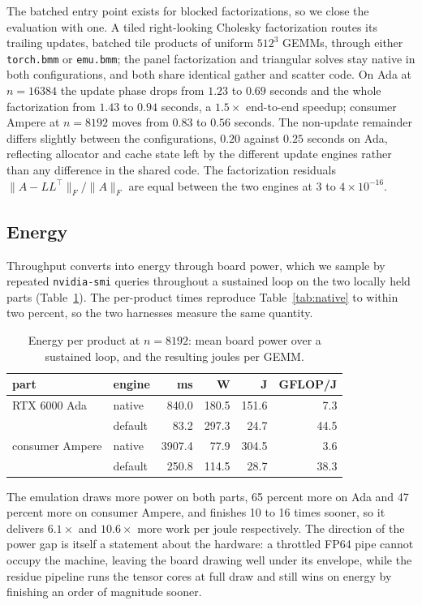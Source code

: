 \documentclass[11pt]{amsart}
\theoremstyle{plain}
\theoremstyle{definition}
\newcommand{\code}[1]{\texttt{#1}}
\begin{document}
The batched entry point exists for blocked factorizations, so we close
the evaluation with one. A tiled right-looking Cholesky factorization
routes its trailing updates, batched tile products of uniform
$512^3$ GEMMs, through either \code{torch.bmm} or \code{emu.bmm}; the
panel factorization and triangular solves stay native in both
configurations, and both share identical gather and scatter code. On Ada
at $n = 16384$ the update phase drops from $1.23$ to $0.69$ seconds and
the whole factorization from $1.43$ to $0.94$ seconds, a $1.5\times$
end-to-end speedup; consumer Ampere at $n = 8192$ moves from $0.83$ to
$0.56$ seconds. The non-update remainder differs slightly between the
configurations, $0.20$ against $0.25$ seconds on Ada, reflecting
allocator and cache state left by the different update engines rather
than any difference in the shared code. The factorization residuals
$\|A - LL^{\top}\|_F / \|A\|_F$ are equal between the two engines at
$3$ to $4 \times 10^{-16}$.

\subsection{Energy}\label{sec:energy}

Throughput converts into energy through board power, which we sample by
repeated \code{nvidia-smi} queries throughout a sustained loop on the two
locally held parts (Table~\ref{tab:energy}). The per-product times
reproduce Table~\ref{tab:native} to within two percent, so the two
harnesses measure the same quantity.

\begin{table}[t]
\centering
\caption{Energy per product at $n = 8192$: mean board power over a
sustained loop, and the resulting joules per GEMM.}
\label{tab:energy}
\begin{tabular}{llrrrr}
\toprule
part & engine & ms & W & J & GFLOP/J \\
\midrule
RTX 6000 Ada & native & 840.0 & 180.5 & 151.6 & 7.3 \\
 & default & 83.2 & 297.3 & 24.7 & 44.5 \\
consumer Ampere & native & 3907.4 & 77.9 & 304.5 & 3.6 \\
 & default & 250.8 & 114.5 & 28.7 & 38.3 \\
\bottomrule
\end{tabular}
\end{table}

The emulation draws more power on both parts, 65 percent more on Ada and
47 percent more on consumer Ampere, and finishes 10 to 16 times sooner,
so it delivers $6.1\times$ and $10.6\times$ more work per joule
respectively. The direction of the power gap is itself a statement about
the hardware: a throttled FP64 pipe cannot occupy the machine, leaving
the board drawing well under its envelope, while the residue pipeline
runs the tensor cores at full draw and still wins on energy by finishing
an order of magnitude sooner.
\end{document}
